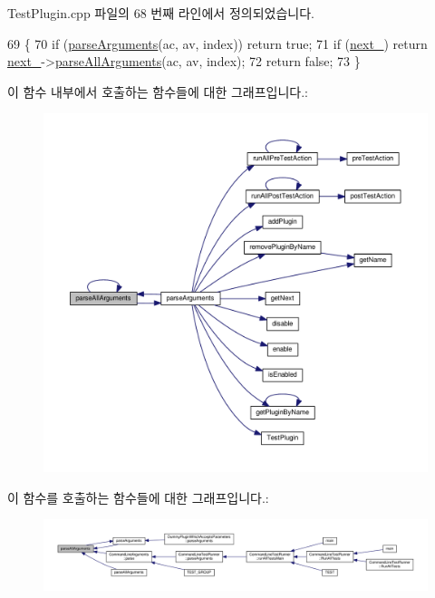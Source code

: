 Test\+Plugin.\+cpp 파일의 68 번째 라인에서 정의되었습니다.


\begin{DoxyCode}
69 \{
70     \textcolor{keywordflow}{if} (\hyperlink{class_test_plugin_a167c2b07a0f83726bb9b1d1c0d741f88}{parseArguments}(ac, av, index)) \textcolor{keywordflow}{return} \textcolor{keyword}{true};
71     \textcolor{keywordflow}{if} (\hyperlink{class_test_plugin_a9461650e936ee3765377081fb8bc15dc}{next\_}) \textcolor{keywordflow}{return} \hyperlink{class_test_plugin_a9461650e936ee3765377081fb8bc15dc}{next\_}->\hyperlink{class_test_plugin_acfa2bcea2c98a16cb7d2a8f177bb84b9}{parseAllArguments}(ac, av, index);
72     \textcolor{keywordflow}{return} \textcolor{keyword}{false};
73 \}
\end{DoxyCode}


이 함수 내부에서 호출하는 함수들에 대한 그래프입니다.\+:
\nopagebreak
\begin{figure}[H]
\begin{center}
\leavevmode
\includegraphics[width=350pt]{class_test_plugin_acfa2bcea2c98a16cb7d2a8f177bb84b9_cgraph}
\end{center}
\end{figure}




이 함수를 호출하는 함수들에 대한 그래프입니다.\+:
\nopagebreak
\begin{figure}[H]
\begin{center}
\leavevmode
\includegraphics[width=350pt]{class_test_plugin_acfa2bcea2c98a16cb7d2a8f177bb84b9_icgraph}
\end{center}
\end{figure}


